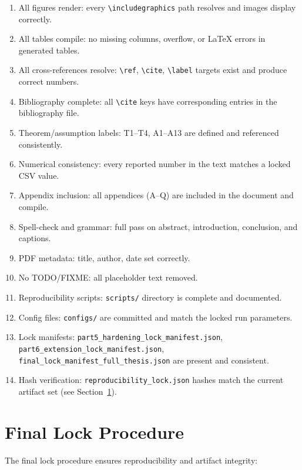 \begin{enumerate}
\item All figures render: every \texttt{\textbackslash includegraphics} path resolves and images display correctly.
\item All tables compile: no missing columns, overflow, or LaTeX errors in generated tables.
\item All cross-references resolve: \texttt{\textbackslash ref}, \texttt{\textbackslash cite}, \texttt{\textbackslash label} targets exist and produce correct numbers.
\item Bibliography complete: all \texttt{\textbackslash cite} keys have corresponding entries in the bibliography file.
\item Theorem/assumption labels: T1--T4, A1--A13 are defined and referenced consistently.
\item Numerical consistency: every reported number in the text matches a locked CSV value.
\item Appendix inclusion: all appendices (A--Q) are included in the document and compile.
\item Spell-check and grammar: full pass on abstract, introduction, conclusion, and captions.
\item PDF metadata: title, author, date set correctly.
\item No TODO/FIXME: all placeholder text removed.
\item Reproducibility scripts: \texttt{scripts/} directory is complete and documented.
\item Config files: \texttt{configs/} are committed and match the locked run parameters.
\item Lock manifests: \texttt{part5\_hardening\_lock\_manifest.json}, \texttt{part6\_extension\_lock\_manifest.json}, \texttt{final\_lock\_manifest\_full\_thesis.json} are present and consistent.
\item Hash verification: \texttt{reproducibility\_lock.json} hashes match the current artifact set (see Section~\ref{sec:final-lock}).
\end{enumerate}

\section{Final Lock Procedure}
\label{sec:final-lock}

The final lock procedure ensures reproducibility and artifact integrity:

